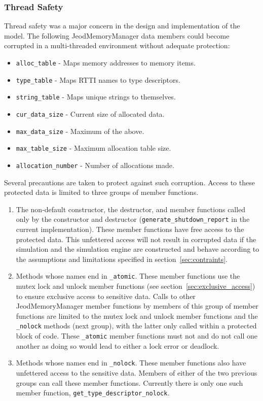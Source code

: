 \subsubsection{Thread Safety}
Thread safety was a major concern in the design and implementation of the model.
The following JeodMemoryManager data members could become corrupted in a
multi-threaded environment without adequate protection:
\begin{itemize}
\item \verb|alloc_table| - Maps memory addresses to memory items.
\item \verb|type_table| - Maps RTTI names to type descriptors.
\item \verb|string_table| - Maps unique strings to themselves.
\item \verb|cur_data_size| - Current size of allocated data.
\item \verb|max_data_size| - Maximum of the above.
\item \verb|max_table_size| - Maximum allocation table size.
\item \verb|allocation_number| - Number of allocations made.
\end{itemize}

Several precautions are taken to protect against such corruption.
Access to these protected data is limited to three groups of member functions.
\begin{enumerate}
\item The non-default constructor, the destructor, and member functions
  called only by the constructor and destructor (\verb|generate_shutdown_report|
  in the current implementation).
  These member functions have free access to the protected data.
  This unfettered access will not result in corrupted data if the simulation 
  and the simulation engine are constructed and behave according to the
  assumptions and limitations specified in section~\ref{sec:contraints}.
\item Methods whose names end in \verb|_atomic|. These member functions use the
  mutex lock and unlock member functions (see
  section~\ref{sec:exclusive_access}) to ensure exclusive access to
  sensitive data. Calls to other JeodMemoryManager member functions by
  members of this group of member functions are limited to the mutex lock and
  unlock member functions and the \verb|_nolock| methods (next group), with the
  latter only called within a protected block of code. These \verb|_atomic|
  member functions must not and do not call one another as doing so would lead
  to either a lock error or deadlock.
\item Methods whose names end in \verb|_nolock|. These member functions also
  have unfettered access to the sensitive data. Members of either of the two
  previous groups can call these member functions. Currently there is only one
  such member function, \verb|get_type_descriptor_nolock|.
\end{enumerate}

